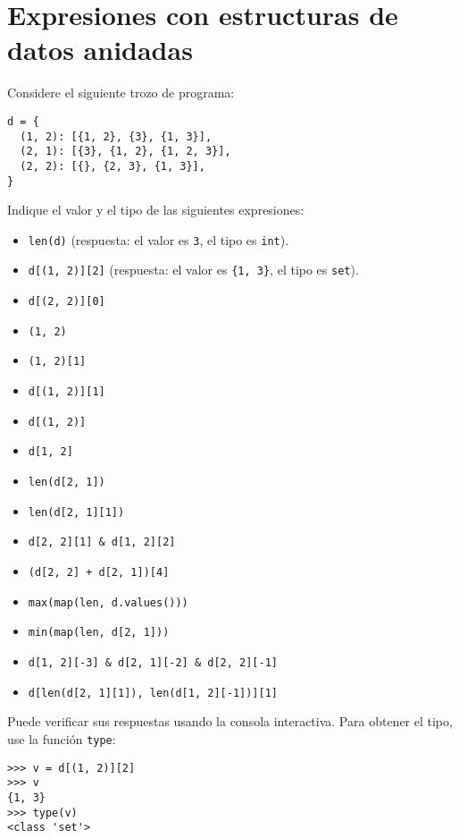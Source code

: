 \section{Expresiones con estructuras de datos anidadas}

Considere el siguiente trozo de programa:
\begin{lstlisting}
d = {
  (1, 2): [{1, 2}, {3}, {1, 3}],
  (2, 1): [{3}, {1, 2}, {1, 2, 3}],
  (2, 2): [{}, {2, 3}, {1, 3}],
}
\end{lstlisting}
Indique el valor y el tipo de las siguientes expresiones:
\begin{itemize}
  \item \lstinline!len(d)!
    \hfill
    (respuesta: el valor es \lstinline!3!,
    el tipo es \lstinline!int!).
  \item \lstinline!d[(1, 2)][2]!
    \hfill
    (respuesta: el valor es \lstinline!{1, 3}!,
    el tipo es \lstinline!set!).
  \item \lstinline!d[(2, 2)][0]!
  \item \lstinline!(1, 2)!
  \item \lstinline!(1, 2)[1]!
  \item \lstinline!d[(1, 2)][1]!
  \item \lstinline!d[(1, 2)]!
  \item \lstinline!d[1, 2]!
  \item \lstinline!len(d[2, 1])!
  \item \lstinline!len(d[2, 1][1])!
  \item \lstinline!d[2, 2][1] & d[1, 2][2]!
  \item \lstinline!(d[2, 2] + d[2, 1])[4]!
  \item \lstinline!max(map(len, d.values()))!
  \item \lstinline!min(map(len, d[2, 1]))!
  \item \lstinline!d[1, 2][-3] & d[2, 1][-2] & d[2, 2][-1]!
  \item \lstinline!d[len(d[2, 1][1]), len(d[1, 2][-1])][1]!
\end{itemize}
Puede verificar sus respuestas usando la consola interactiva. Para
obtener el tipo, use la función \lstinline!type!:
\begin{lstlisting}
>>> v = d[(1, 2)][2]
>>> v
{1, 3}
>>> type(v)
<class 'set'>
\end{lstlisting}

